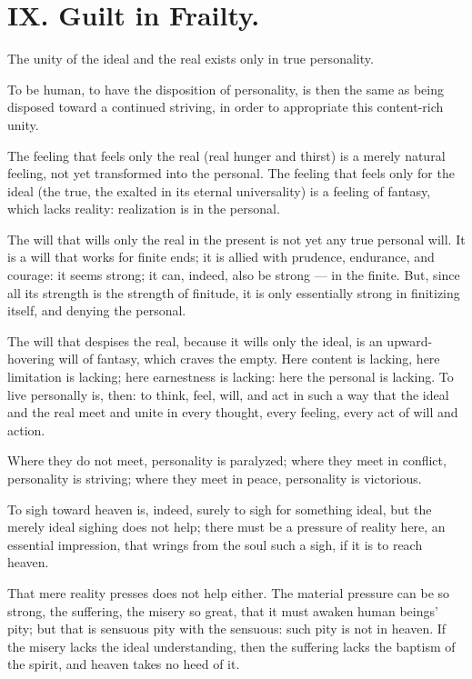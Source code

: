 \documentclass[12pt,a4paper]{book}
\begin{document}
\chapter*{IX. Guilt in Frailty.}
\label{ch:forel9}

The unity of the ideal and the real exists only in true personality.

To be human, to have the disposition of personality, is then the same as being disposed toward a continued striving, in order to appropriate this content-rich unity.

The feeling that feels only the real (real hunger and thirst) is a merely natural feeling, not yet transformed into the personal. The feeling that feels only for the ideal (the true, the exalted in its eternal universality) is a feeling of fantasy, which lacks reality: realization is in the personal.

The will that wills only the real in the present is not yet any true personal will. It is a will that works for finite ends; it is allied with prudence, endurance, and courage: it seems strong; it can, indeed, also be strong --- in the finite. But, since all its strength is the strength of finitude, it is only essentially strong in finitizing itself, and denying the personal.

The will that despises the real, because it wills only the ideal, is an upward-hovering will of fantasy, which craves the empty. Here content is lacking, here limitation is lacking; here earnestness is lacking: here the personal is lacking.
To live personally is, then: to think, feel, will, and act in such a way that the ideal and the real meet and unite in every thought, every feeling, every act of will and action.

Where they do not meet, personality is paralyzed; where they meet in conflict, personality is striving; where they meet in peace, personality is victorious.

To sigh toward heaven is, indeed, surely to sigh for something ideal, but the merely ideal sighing does not help; there must be a pressure of reality here, an essential impression, that wrings from the soul such a sigh, if it is to reach heaven.

That mere reality presses does not help either. The material pressure can be so strong, the suffering, the misery so great, that it must awaken human beings' pity; but that is sensuous pity with the sensuous: such pity is not in heaven. If the misery lacks the ideal understanding, then the suffering lacks the baptism of the spirit, and heaven takes no heed of it.
\end{document}
